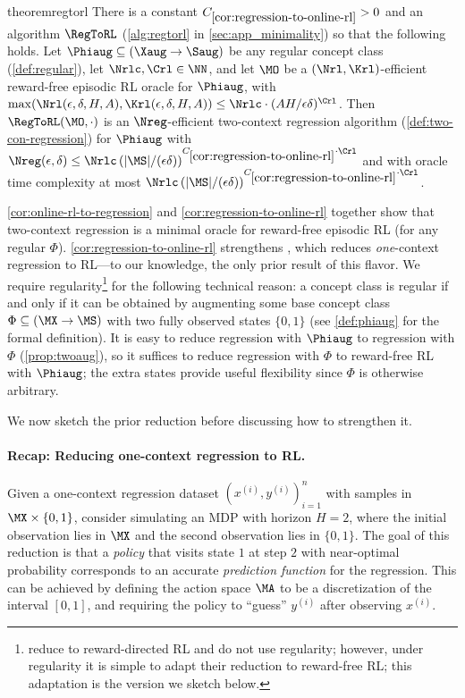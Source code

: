 \begin{restatable}{theorem}{regtorl}\label{cor:regression-to-online-rl}
There is a constant $C_{\ref{cor:regression-to-online-rl}}>0$ and an algorithm $\RegToRL$ (\cref{alg:regtorl} in \cref{sec:app_minimality}) so that the following holds. Let $\Phiaug \subseteq (\Xaug\to\Saug)$ be any regular concept class (\cref{def:regular}), let $\Nrlc,\Crl \in \NN$, and let $\MO$ be a $(\Nrl,\Krl)$-efficient reward-free episodic RL oracle for $\Phiaug$, with $\max(\Nrl(\epsilon,\delta,H,A),\Krl(\epsilon,\delta,H,A)) \leq \Nrlc \cdot (AH/\epsilon\delta)^{\Crl}$. Then $\RegToRL(\MO,\cdot)$ is an $\Nreg$-efficient two-context regression algorithm (\cref{def:two-con-regression}) for $\Phiaug$ with 
$\Nreg(\epsilon,\delta) \leq \Nrlc \left(|\MS|/(\epsilon\delta)\right)^{C_{\ref{cor:regression-to-online-rl}} \cdot \Crl}$ and with oracle time complexity at most $\Nrlc \left(|\MS|/(\epsilon\delta)\right)^{C_{\ref{cor:regression-to-online-rl}} \cdot \Crl}$.
\end{restatable}

\cref{cor:online-rl-to-regression} and \cref{cor:regression-to-online-rl} together show that two-context regression is a minimal oracle for reward-free episodic RL (for any regular $\Phi$). \cref{cor:regression-to-online-rl} strengthens \cite[Proposition B.2]{golowich2024exploration}, which reduces \emph{one}-context regression to RL---to our knowledge, the only prior result of this flavor. We require regularity\footnote{ \cite{golowich2024exploration} reduce to reward-directed RL and do not use regularity; however, under regularity it is simple to adapt their reduction to reward-free RL; this adaptation is the version we sketch below.} for the following technical reason: a concept class is regular if and only if it can be obtained by augmenting some base concept class $\Phi \subseteq (\MX\to\MS)$ with two fully observed states $\{0,1\}$ (see \cref{def:phiaug} for the formal definition). It is easy to reduce regression with $\Phiaug$ to regression with $\Phi$ (\cref{prop:twoaug}), so it suffices to reduce regression with $\Phi$ to reward-free RL with $\Phiaug$; the extra states provide useful flexibility since $\Phi$ is otherwise arbitrary.

We now sketch the prior reduction before discussing how to strengthen it.

\paragraph{Recap: Reducing one-context regression to RL.} Given a one-context regression dataset $(x^{(i)},y^{(i)})_{i=1}^n$ with samples in $\MX\times\{0,1\}$, consider simulating an MDP with horizon $H=2$, where the initial observation lies in $\MX$ and the second observation lies in $\{0,1\}$. The goal of this reduction is that a \emph{policy} that visits state $1$ at step $2$ with near-optimal probability corresponds to an accurate \emph{prediction function} for the regression. This can be achieved by defining the action space $\MA$ to be a discretization of the interval $[0,1]$, and requiring the policy to ``guess'' $y^{(i)}$ after observing $x^{(i)}$. 

